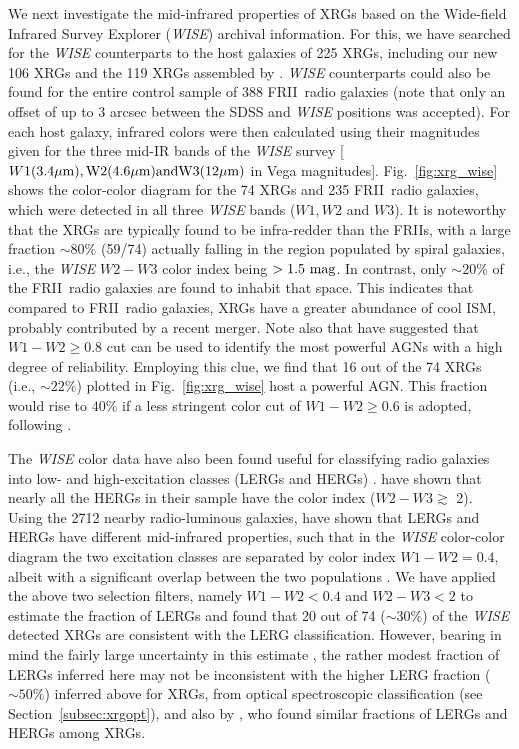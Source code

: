 \documentclass[twocolumn]{aastex62}
\def\frii{FR{II}~}
\begin{document}
We next investigate the mid-infrared properties of XRGs based on the
Wide-field Infrared Survey Explorer ({\it WISE}) archival information. For this, 
we have searched for the {\it WISE} counterparts to the host galaxies of 225 XRGs, 
including our  new 106 XRGs and the 119 XRGs assembled by \citet{Cheung2007AJ....133.2097C}. 
{\it WISE} counterparts could also be found for the entire control sample of 388 
\frii radio galaxies (note that only an offset of up to 3 arcsec between 
the SDSS and {\it WISE} positions was accepted). For each host galaxy, infrared 
colors were then calculated using their magnitudes given for the three mid-IR 
bands of the {\it WISE} survey [$W1 \rm (3.4\mu m), W2(4.6\mu m) and W3 (12\mu m)$
 in Vega magnitudes]. Fig.~\ref{fig:xrg_wise} shows the
color-color diagram for the 74 XRGs and 235 \frii radio galaxies,  which were
detected in all  three  {\it WISE} bands ($W1, W2$ and $W3$). 
It is noteworthy that the XRGs are typically found to be infra-redder than the
FRIIs, with a large fraction $\sim 80\%$ (59/74) actually falling in the 
region populated by spiral galaxies, i.e., the {\it WISE} $W2-W3$ color index
being $> 1.5 \rm~ mag$. In contrast, only $\sim 20\%$ of the \frii radio 
galaxies are found to inhabit that space. This indicates that compared to 
\frii radio galaxies, XRGs have a greater abundance of cool ISM, probably 
contributed by a recent merger. Note also that \citet{Stern2012ApJ...753...30S} 
have suggested that $W1-W2 \ge 0.8$ cut can be used to identify the most 
powerful AGNs with a high degree of reliability. Employing this clue, we 
find that 16 out of the 74 XRGs (i.e., $\sim 22\%$) plotted in
Fig.~\ref{fig:xrg_wise} host a powerful AGN. This fraction would 
rise to $40\%$ if a less stringent color cut of $W1-W2 \ge 0.6$ is adopted,
following \citet{Wright2010AJ....140.1868W}.\par


The {\it WISE} color data have also been found useful for classifying radio 
galaxies into low- and high-excitation classes (LERGs and HERGs)
 \citep[see,][]{Gurkan2014MNRAS.438.1149G}.  
 \citet{Sadler2014MNRAS.438..796S} have shown that nearly all the HERGs 
in their sample have the color index ($W2-W3 \gtrsim$ 2).
Using the 2712 nearby radio-luminous galaxies, \citet{Yang2015MNRAS.449.3191Y} 
have shown that LERGs and HERGs have different mid-infrared properties, 
such that in the {\it WISE} color-color diagram the two excitation classes are 
separated by 
color index $W1-W2 = 0.4$, albeit with a significant overlap between 
the two populations \citep[see, also][]{Pace2016ApJ...818...65P}. 
We have applied the above two selection filters, namely $W1-W2 < 0.4$ 
and $W2-W3 < 2$  to estimate the fraction 
of LERGs and found that 20 out of 74 ($\sim 30\%$) of the {\it WISE} detected 
XRGs are consistent with the LERG classification.  However, bearing in 
mind the fairly large uncertainty in this estimate \citep{Pace2016ApJ...818...65P}, 
the rather modest fraction of LERGs inferred here may not be inconsistent 
with the higher LERG fraction ($\sim 50\%$) inferred above for XRGs, from 
optical spectroscopic classification (see Section~\ref{subsec:xrgopt}),
and also by  \citet{Gillone2016A&A...587A..25G}, who found similar  fractions of LERGs and HERGs
among XRGs.
\end{document}
